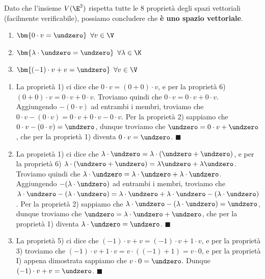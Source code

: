 \documentclass[11pt, a4paper, titlepage, oneside]{scrbook}
\begin{document}
\bigskip

Dato che l'insieme $V(\E^2)$ rispetta tutte le 8 proprietà degli spazi vettoriali (facilmente verificabile), possiamo concludere che \textbf{è uno spazio vettoriale}. 

\begin{Proprieta}
\label{prop-spaz-vett}
\begin{enumerate}[label=\Roman*)]
    \item $\bm{0 \cdot v = \undzero} \enspace \forall v \in \V$
    \item $\bm{\lambda \cdot \undzero = \undzero} \enspace \forall \lambda \in \K$
    \item $\bm{(-1) \cdot v + v = \undzero} \enspace \forall v \in \V$
\end{enumerate}
\end{Proprieta}

\Dimostrazione \nopagebreak

\begin{enumerate}[label=\Roman*)]
    \item La proprietà 1) ci dice che $0 \cdot v = (0 + 0) \cdot v$, e per la proprietà 6) $(0 + 0) \cdot v = 0 \cdot v + 0 \cdot v$. Troviamo quindi che $0 \cdot v = 0 \cdot v + 0 \cdot v$. Aggiungendo $-(0 \cdot v)$ ad entrambi i membri, troviamo che $0 \cdot v - (0 \cdot v) = 0 \cdot v + 0 \cdot v - 0 \cdot v$. 
    Per la proprietà 2) sappiamo che $0 \cdot v - (0 \cdot v) = \undzero$, dunque troviamo che $\undzero = 0 \cdot v + \undzero$, che per la proprietà 1) diventa $0 \cdot v = \undzero$. $\blacksquare$
    \item La proprietà 1) ci dice che $\lambda \cdot \undzero = \lambda \cdot (\undzero + \undzero)$, e per la proprietà 6) $\lambda \cdot (\undzero + \undzero) = \lambda \undzero + \lambda \undzero$. Troviamo quindi che $\lambda \cdot \undzero = \lambda \cdot \undzero + \lambda \cdot \undzero$. Aggiungendo $-(\lambda \cdot \undzero)$ ad entrambi i membri, troviamo che $\lambda \cdot \undzero - (\lambda \cdot \undzero) = \lambda \cdot \undzero + \lambda \cdot \undzero - (\lambda \cdot \undzero)$.
    Per la proprietà 2) sappiamo che $\lambda \cdot \undzero - (\lambda \cdot \undzero) = \undzero$, dunque troviamo che $\undzero = \lambda \cdot \undzero + \undzero$, che per la proprietà 1) diventa $\lambda \cdot \undzero = \undzero$. $\blacksquare$
    \item La proprietà 5) ci dice che $(-1) \cdot v + v = (-1) \cdot v + 1 \cdot v$, e per la proprietà 3) troviamo che $(-1) \cdot v + 1 \cdot v = v \cdot ((-1) + 1) = v \cdot 0$, e per la proprietà I) appena dimostrata sappiamo che $v \cdot 0 = \undzero$. Dunque $(-1) \cdot v + v = \undzero$. $\blacksquare$
\end{enumerate}
\end{document}
